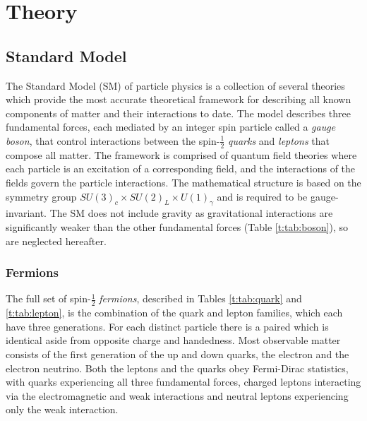 \chapter{Theory}\label{c:Theory}

\section{Standard Model}


The Standard Model (SM) of particle physics is a collection of several theories which provide the most accurate theoretical framework for describing all known components of matter and their interactions to date. The model describes three fundamental forces, each mediated by an integer spin particle called a \textit{gauge boson}, that control interactions between the spin-$\frac{1}{2}$ \textit{quarks} and \textit{leptons} that compose all matter. The framework is comprised of quantum field theories where each particle is an excitation of a corresponding field, and the interactions of the fields govern the particle interactions. The mathematical structure is  based on the symmetry group $SU(3)_c\times SU(2)_L\times U(1)_\gamma$ and is required to be gauge-invariant. The SM does not include gravity as gravitational interactions are significantly weaker than the other fundamental forces (Table \ref{t:tab:boson}), so are neglected hereafter.

	\subsection{Fermions}

		The full set of spin-$\frac{1}{2}$ \textit{fermions}, described in Tables \ref{t:tab:quark} and \ref{t:tab:lepton}, is the combination of the quark and lepton families, which each have three generations. For each distinct particle there is a paired  which is identical aside from opposite charge and handedness. Most observable matter consists of the first generation of the  up and down quarks, the electron and the electron neutrino. Both the leptons and the quarks obey Fermi-Dirac statistics, with quarks experiencing all three fundamental forces, charged leptons interacting via the electromagnetic and weak interactions and neutral leptons experiencing only the weak interaction.

